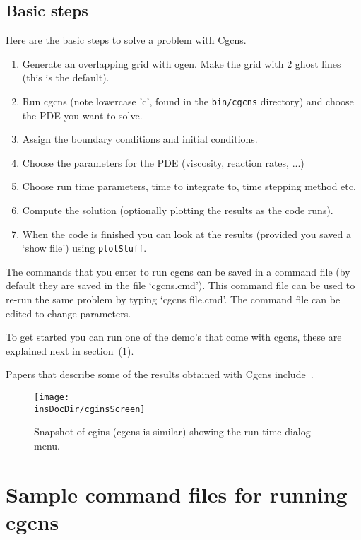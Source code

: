 \documentclass{article}
\newcommand{\Index}[1]{#1\index{#1}}
\newcommand{\insDocDir}{../ins}
\begin{document}
\subsection{Basic steps}
Here are the basic steps to solve a problem with Cgcns.
\begin{enumerate}
  \item Generate an overlapping grid with ogen. Make the grid with 2 ghost lines (this is the default).
  \item Run cgcns (note lowercase 'c', found in the {\tt bin/cgcns} directory) 
        and choose the PDE you want to solve.
  \item Assign the boundary conditions and initial conditions.
  \item Choose the parameters for the PDE (viscosity, reaction rates, ...)
  \item Choose run time parameters, time to integrate to, time stepping method etc.
  \item Compute the solution (optionally plotting the results as the code runs).
  \item When the code is finished you can look at the results (provided you saved a
     `show file') using {\tt plotStuff}.
\end{enumerate}
The commands that you enter to run cgcns can be saved in a \Index{command file} (by default
they are saved in the file `cgcns.cmd'). This command file can be used to re-run
the same problem by typing `cgcns file.cmd'. The command file can be edited to change parameters.

To get started you can run one of the demo's that come with cgcns, these are 
explained next in section~(\ref{sec:demo}).

Papers that describe some of the results obtained with Cgcns include~\cite{pog2008,mog2006,reactamr2003b}. 
  
\begin{figure}[hbt]
\begin{center}
  \texttt{[image: \\insDocDir/cginsScreen]} \\
  \caption{Snapshot of cgins (cgcns is similar) showing the run time dialog menu.}
  \end{center} 
  \label{fig:runTimeScreen}
\end{figure}



\clearpage
\section{Sample command files for running cgcns} \label{sec:demo}
\end{document}
